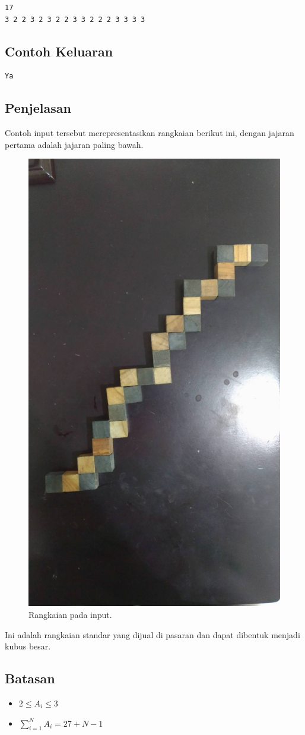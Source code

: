 \documentclass{article}
\begin{document}
\begin{lstlisting}
17
3 2 2 3 2 3 2 2 3 3 2 2 2 3 3 3 3
\end{lstlisting}

\subsection*{Contoh Keluaran}

\begin{lstlisting}
Ya
\end{lstlisting}

\subsection*{Penjelasan}

\par\noindent Contoh input tersebut merepresentasikan rangkaian berikut ini, dengan jajaran pertama adalah jajaran paling bawah.

\begin{figure}[h!]
	\centering
	\includegraphics[width=0.2\linewidth]{sample-input.jpg}
  \caption{Rangkaian pada input.}
\end{figure}

\par\noindent Ini adalah rangkaian standar yang dijual di pasaran dan dapat dibentuk menjadi kubus besar.

\subsection*{Batasan}

\begin{itemize}
	\item $2 \leq A_i \leq 3$
	\item $\sum_{i=1}^{N} A_i = 27 + N - 1$
\end{itemize}
\end{document}

